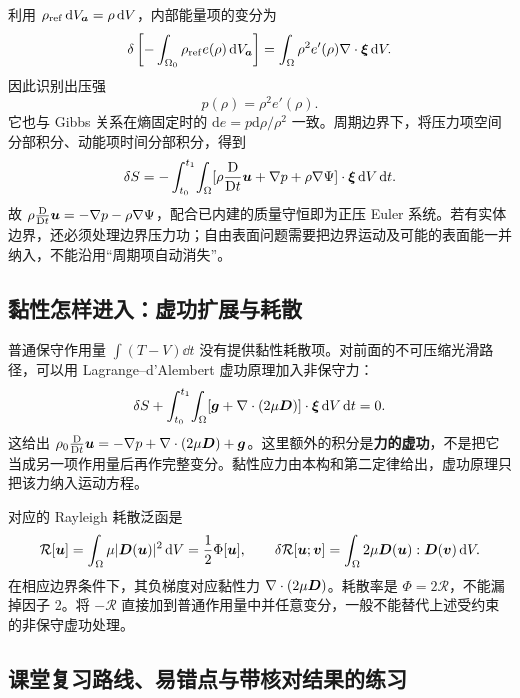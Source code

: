 利用 $\rho_{\mathrm{ref}}\,\mathrm d V_{\bm{a}}=\rho\,\mathrm d V$，内部能量项的变分为
\begin{equation}
 \delta\left[-\int_{\Omega_0}\rho_{\mathrm{ref}}e(\rho)\,\mathrm d V_{\bm{a}}\right]
 =\int_\Omega\rho^2e'(\rho)\nabla\cdot\bm{\xi}\,\mathrm d V.
\end{equation}
因此识别出压强
\begin{equation}
 \boxed{p(\rho)=\rho^2e'(\rho).}
\end{equation}
它也与 Gibbs 关系在熵固定时的 $\mathrm de=p\mathrm d\rho/\rho^2$ 一致。周期边界下，将压力项空间分部积分、动能项时间分部积分，得到
\begin{equation}
 \delta S=-\int_{t_0}^{t_1}\!\int_\Omega
 [\rho\frac{\mathrm D}{\mathrm Dt}\bm{u}+\nabla p+\rho\nabla\Psi]\cdot\bm{\xi}\,\mathrm d V\,\mathrm d t.
\end{equation}
故 $\rho\frac{\mathrm D}{\mathrm Dt}\bm{u}=-\nabla p-\rho\nabla\Psi$，配合已内建的质量守恒即为正压 Euler 系统。若有实体边界，还必须处理边界压力功；自由表面问题需要把边界运动及可能的表面能一并纳入，不能沿用“周期项自动消失”。

\subsection{黏性怎样进入：虚功扩展与耗散}

普通保守作用量 $\int(T-V)\dd t$ 没有提供黏性耗散项。对前面的不可压缩光滑路径，可以用 Lagrange--d'Alembert 虚功原理加入非保守力：
\begin{equation}
 \delta S+\int_{t_0}^{t_1}\!\int_\Omega
 [\bm{g}+\nabla\cdot(2\mu\bm{D})]\cdot\bm{\xi}\,\mathrm d V\,\mathrm d t=0.
\end{equation}
这给出 $\rho_0\frac{\mathrm D}{\mathrm Dt}\bm{u}=-\nabla p+\nabla\cdot(2\mu\bm{D})+\bm{g}$。这里额外的积分是\textbf{力的虚功}，不是把它当成另一项作用量后再作完整变分。黏性应力由本构和第二定律给出，虚功原理只把该力纳入运动方程。

对应的 Rayleigh 耗散泛函是
\begin{equation}
 \mathcal R[\bm{u}]=\int_\Omega\mu|\bm{D}(\bm{u})|^2\,\mathrm d V
 =\frac12\Phi[\bm{u}],\qquad
 \delta\mathcal R[\bm{u};\bm{v}]
 =\int_\Omega2\mu\bm{D}(\bm{u}):\bm{D}(\bm{v})\,\mathrm d V.
\end{equation}
在相应边界条件下，其负梯度对应黏性力 $\nabla\cdot(2\mu\bm{D})$。耗散率是 $\Phi=2\mathcal R$，不能漏掉因子 $2$。将 $-\mathcal R$ 直接加到普通作用量中并任意变分，一般不能替代上述受约束的非保守虚功处理。

\subsection{课堂复习路线、易错点与带核对结果的练习}


